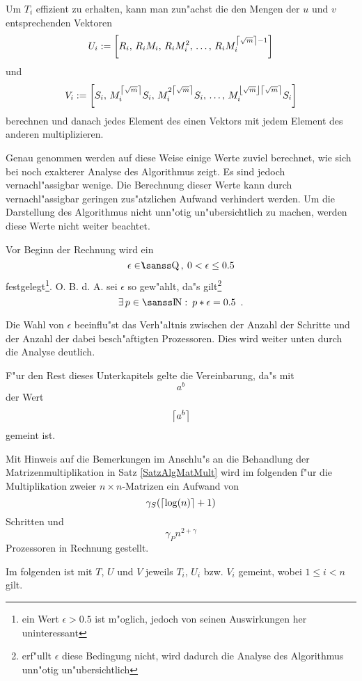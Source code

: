 Um $T_i$ effizient zu erhalten, kann man zun"achst die den Mengen der $u$
und $v$ entsprechenden Vektoren
\[
   U_i := \left[ R_i,\, R_i M_i,\, R_i M_i^2,\, 
                 \ldots ,\, R_i M_i^{\left\lceil \sqrt{m} \right\rceil - 1} 
          \right]
\]
und
\[
   V_i := \left[ S_i,\, M_i^{\left\lceil\sqrt{m}\right\rceil} S_i,\, 
                    M_i^{2\left\lceil\sqrt{m}\right\rceil} S_i,\,
                \ldots,\, M_i^{\left\lfloor\sqrt{m}\right\rfloor \left\lceil\sqrt{m}\right\rceil} S_i
          \right]
\]
berechnen und danach jedes Element des einen Vektors mit jedem Element
des anderen multiplizieren.

Genau genommen werden auf diese Weise einige Werte zuviel berechnet, wie
sich bei noch exakterer Analyse des Algorithmus zeigt. Es sind jedoch
vernachl"assigbar wenige. Die Berechnung dieser Werte kann durch
vernachl"assigbar geringen zus"atzlichen Aufwand verhindert werden. Um die
Darstellung des Algorithmus nicht unn"otig un"ubersichtlich zu machen,
werden diese Werte nicht weiter beachtet.

Vor Beginn der Rechnung wird ein \label{PageWahlEpsilon} 
\[ \epsilon \in \Rationals \, , \: 0 < \epsilon \leq 0.5 \]
festgelegt\footnote{ein Wert $\epsilon>0.5$ ist m"oglich, jedoch von
                     seinen Auswirkungen her uninteressant}.
O. B. d. A. sei $\epsilon$ so gew"ahlt, da"s 
gilt\footnote{erf"ullt $\epsilon$ diese Bedingung nicht, wird dadurch
              die Analyse des Algorithmus unn"otig un"ubersichtlich}
\[
   \exists \, p \in \Nat : \: p * \epsilon = 0.5 \MyPunkt
\]

Die Wahl von $\epsilon$ beeinflu"st das Verh"altnis zwischen der Anzahl
der Schritte und der Anzahl der dabei besch"aftigten Prozessoren.
Dies wird weiter unten durch die Analyse deutlich.

F"ur den Rest dieses Unterkapitels gelte die Vereinbarung, da"s mit
\[ a^b \] der Wert \[ \left\lceil a^b \right\rceil \] gemeint ist.

Mit Hinweis auf die Bemerkungen im Anschlu"s an die Behandlung der
Matrizenmultiplikation in Satz \ref{SatzAlgMatMult} wird im folgenden
f"ur die Multiplikation zweier $n \times n$-Matrizen ein Aufwand von
\[ \gamma_S (\left\lceil \log(n) \right\rceil + 1) \] Schritten und
\[ \gamma_P n^{2+\gamma} \] Prozessoren in Rechnung gestellt.

Im folgenden ist mit $T$, $U$ und $V$ jeweils $T_i$, $U_i$ bzw. $V_i$
gemeint, wobei $1 \leq i < n$ gilt.

